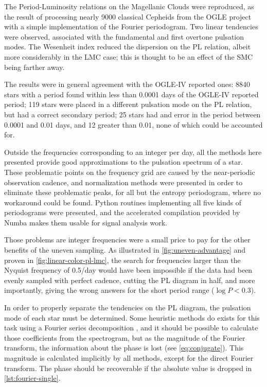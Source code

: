 The Period-Luminosity relations on the Magellanic Clouds were reproduced,
as the result of processing nearly 9000 classical Cepheids from the OGLE project with a simple implementation of the Fourier periodogram.
Two linear tendencies were observed, associated with the fundamental and first overtone pulsation modes.
The Wesenheit index reduced the dispersion on the PL relation, albeit more considerably in the LMC case;
this is thought to be an effect of the SMC being farther away.

The results were in general agreement with the OGLE-IV reported ones:
8840 stars with a period found within less than 0.0001 days of the OGLE-IV reported period;
119 stars were placed in a different pulsation mode on the PL relation, but had a correct secondary period; 
25 stars had and error in the period between 0.0001 and 0.01 days, and 12 greater than 0.01, none of which could be accounted for.

Outside the frequencies corresponding to an integer per day, all the methods here presented provide good approximations to the pulsation spectrum of a star.
These problematic points on the frequency grid are caused by the near-periodic observation cadence,
and normalization methods were presented in order to eliminate these problematic peaks, for all but the entropy periodogram,
where no workaround could be found. 
Python routines implementing all five kinds of periodograms were presented,
and the accelerated compilation provided by Numba makes them usable for signal analysis work.

Those problems are integer frequencies were a small price to pay for the other benefits of the uneven sampling.
As illustrated in \autoref{fig:uneven-advantage} and proven in \autoref{fig:linear-color-pl-lmc}, 
the search for frequencies larger than the Nyquist frequency of 0.5/day would have been impossible if the data had been evenly sampled with perfect cadence,
cutting the PL diagram in half, and more importantly, giving the wrong answers for the short period range ($\log P <0.3$).



In order to properly separate the tendencies on the PL diagram, the pulsation mode of each star must be determined.
Some heuristic methods do exists for this task using a Fourier series decomposition \citep{Zabolotski2005}, 
and it should be possible to calculate those coefficients from the spectrogram,
but as the magnitude of the Fourier transform, the information about the phase is lost (see \autoref{eq:conjugate}).
This magnitude is calculated implicitly by all methods, except for the direct Fourier transform.
The phase should be recoverable if the absolute value is dropped in \autoref{lst:fourier-single}.

